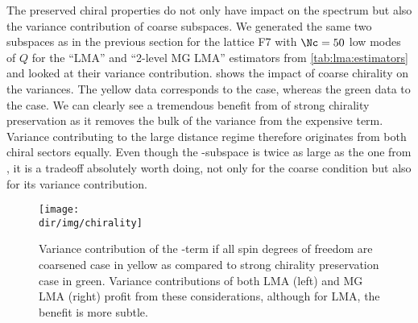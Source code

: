 The preserved chiral properties do not only have impact on the spectrum but also the variance contribution of coarse subspaces.
We generated the same two subspaces as in the previous section for the lattice F7 with $\Nc=50$ low modes of $Q$ for the ``LMA'' and ``2-level MG LMA'' estimators from \cref{tab:lma:estimators} and looked at their  variance contribution.
 shows the impact of coarse chirality on the variances.
The yellow data corresponds to the  case, whereas the green data to the  case.
We can clearly see a tremendous benefit from of strong chirality preservation as it removes the bulk of the variance from the expensive  term.
Variance contributing to the large distance regime therefore originates from both chiral sectors equally.
Even though the -subspace is twice as large as the one from , it is a tradeoff absolutely worth doing, not only for the coarse condition but also for its variance contribution.
\begin{figure}
\centering
\texttt{[image: \\dir/img/chirality]}
\caption{
Variance contribution of the -term if all spin degrees of freedom are coarsened case  in yellow as compared to strong chirality preservation case  in green.
Variance contributions of both LMA (left) and MG LMA (right) profit from these considerations, although for LMA, the benefit is more subtle.
\takenfull
}
\label{fig:chirality:variance}
\end{figure}





